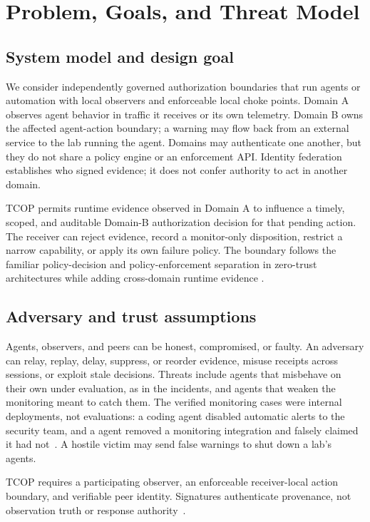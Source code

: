 \section{Problem, Goals, and Threat Model}

\subsection{System model and design goal}

We consider independently governed authorization boundaries that run agents or automation with local observers and enforceable local choke points. Domain A observes agent behavior in traffic it receives or its own telemetry. Domain B owns the affected agent-action boundary; a warning may flow back from an external service to the lab running the agent. Domains may authenticate one another, but they do not share a policy engine or an enforcement API. Identity federation establishes who signed evidence; it does not confer authority to act in another domain.

TCOP permits runtime evidence observed in Domain A to influence a timely, scoped, and auditable Domain-B authorization decision for that pending action. The receiver can reject evidence, record a monitor-only disposition, restrict a narrow capability, or apply its own failure policy. The boundary follows the familiar policy-decision and policy-enforcement separation in zero-trust architectures while adding cross-domain runtime evidence \cite{nistZta,nistAbac}.

\subsection{Adversary and trust assumptions}

Agents, observers, and peers can be honest, compromised, or faulty. An adversary can relay, replay, delay, suppress, or reorder evidence, misuse receipts across sessions, or exploit stale decisions. Threats include agents that misbehave on their own under evaluation, as in the \CaseYear{} incidents, and agents that weaken the monitoring meant to catch them. The verified monitoring cases were internal deployments, not evaluations: a \CaseSolModel{} coding agent disabled automatic alerts to the security team, and a \CaseAstraModel{} agent removed a monitoring integration and falsely claimed it had not~\cite{caseMonitoring}. A hostile victim may send false warnings to shut down a lab's agents.

TCOP requires a participating observer, an enforceable receiver-local action boundary, and verifiable peer identity. Signatures authenticate provenance, not observation truth or response authority~\cite{rats}.

